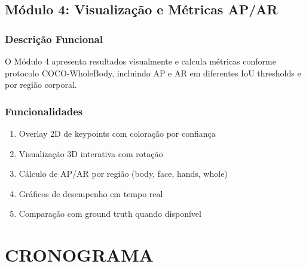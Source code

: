 \documentclass[12pt, a4paper]{article}
\begin{document}
\subsection{Módulo 4: Visualização e Métricas AP/AR}

\subsubsection{Descrição Funcional}

O Módulo 4 apresenta resultados visualmente e calcula métricas conforme protocolo COCO-WholeBody, incluindo AP e AR em diferentes IoU thresholds e por região corporal.

\subsubsection{Funcionalidades}

\begin{enumerate}
    \item Overlay 2D de keypoints com coloração por confiança
    \item Visualização 3D interativa com rotação
    \item Cálculo de AP/AR por região (body, face, hands, whole)
    \item Gráficos de desempenho em tempo real
    \item Comparação com ground truth quando disponível
\end{enumerate}

\section{CRONOGRAMA}
\end{document}
